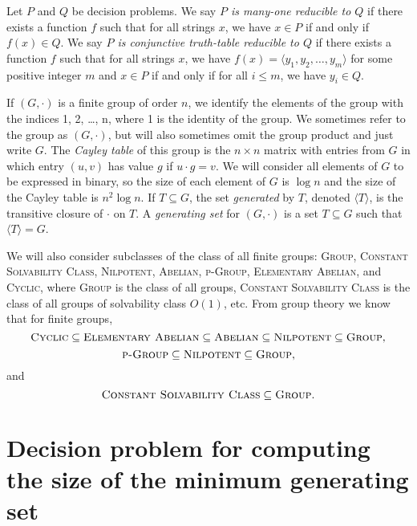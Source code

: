 \documentclass{article}
\newcommand{\gen}[1]{{\langle #1 \rangle}}
\begin{document}
Let $P$ and $Q$ be decision problems.
We say \emph{$P$ is many-one reducible to $Q$} if there exists a function $f$ such that for all strings $x$, we have $x \in P$ if and only if $f(x) \in Q$.
We say \emph{$P$ is conjunctive truth-table reducible to $Q$} if there exists a function $f$ such that for all strings $x$, we have $f(x) = \langle y_1, y_2, \dotsc, y_m \rangle$ for some positive integer $m$ and $x \in P$ if and only if for all $i \leq m$, we have $y_i \in Q$.

If $(G, \cdot)$ is a finite group of order $n$, we identify the elements of the group with the indices 1, 2, \ldots, n, where 1 is the identity of the group.
We sometimes refer to the group as $(G, \cdot)$, but will also sometimes omit the group product and just write $G$.
The \emph{Cayley table} of this group is the $n \times n$ matrix with entries from $G$ in which entry $(u, v)$ has value $g$ if $u \cdot g = v$.
We will consider all elements of $G$ to be expressed in binary, so the size of each element of $G$ is $\log n$ and the size of the Cayley table is $n^2 \log n$.
If $T \subseteq G$, the set \emph{generated} by $T$, denoted $\gen{T}$, is the transitive closure of $\cdot$ on $T$.
A \emph{generating set} for $(G, \cdot)$ is a set $T \subseteq G$ such that $\gen{T} = G$.

We will also consider subclasses of the class of all finite groups: \textsc{Group}, \textsc{Constant Solvability Class}, \textsc{Nilpotent}, \textsc{Abelian}, \textsc{p-Group}, \textsc{Elementary Abelian}, and \textsc{Cyclic}, where \textsc{Group} is the class of all groups, \textsc{Constant Solvability Class} is the class of all groups of solvability class $O(1)$, etc.
From group theory we know that for finite groups,
\begin{equation*}
  \textsc{Cyclic} \subseteq \textsc{Elementary Abelian} \subseteq \textsc{Abelian} \subseteq \textsc{Nilpotent} \subseteq \textsc{Group},
\end{equation*}
\begin{equation*}
  \textsc{p-Group} \subseteq \textsc{Nilpotent} \subseteq \textsc{Group},
\end{equation*}
and
\begin{equation*}
  \textsc{Constant Solvability Class} \subseteq \textsc{Group}.
\end{equation*}

\section{Decision problem for computing the size of the minimum generating set}
\end{document}
